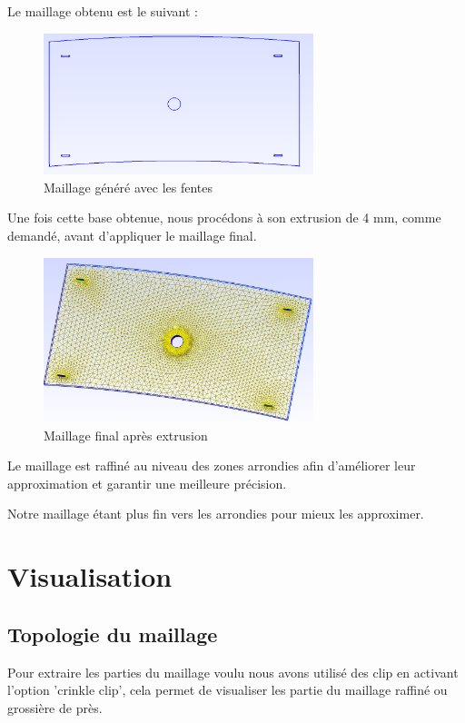 \documentclass{article}
\begin{document}
Le maillage obtenu est le suivant :

\begin{figure}[H]
    \centering
    \includegraphics[width=0.7\textwidth]{images/gmsh_2.png}
    \caption{Maillage généré avec les fentes}
\end{figure}

Une fois cette base obtenue, nous procédons à son extrusion de 4 mm, comme demandé, avant d'appliquer le maillage final.

\begin{figure}[H]
    \centering
    \includegraphics[width=0.7\textwidth]{images/gmsh_3.png}
    \caption{Maillage final après extrusion}
\end{figure}

Le maillage est raffiné au niveau des zones arrondies afin d'améliorer leur approximation et garantir une meilleure précision.


Notre maillage étant plus fin vers les arrondies pour mieux les approximer.
\section{Visualisation}

\subsection{Topologie du maillage}

Pour extraire les parties du maillage voulu nous avons utilisé des clip en activant l'option 'crinkle clip', 
cela permet de visualiser les partie du maillage raffiné ou grossière de près.
\end{document}

